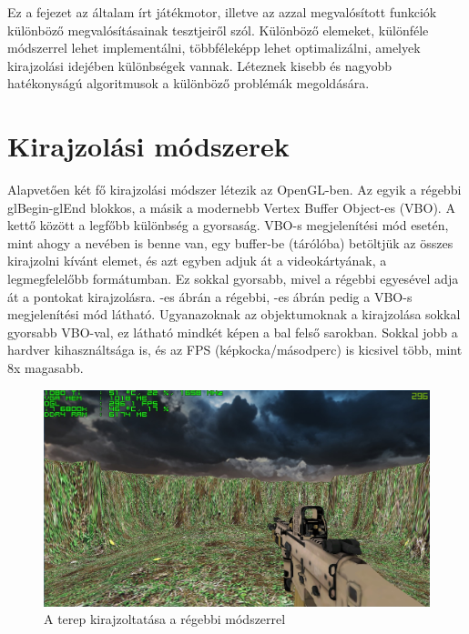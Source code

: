 \label{Chap:tesztek}


Ez a fejezet az általam írt játékmotor, illetve az azzal megvalósított funkciók különböző megvalósításainak tesztjeiről szól. Különböző elemeket, különféle módszerrel lehet implementálni, többféleképp lehet optimalizálni, amelyek kirajzolási idejében különbségek vannak. Léteznek kisebb és nagyobb hatékonyságú algoritmusok a különböző problémák megoldására.

\section{Kirajzolási módszerek}

Alapvetően két fő kirajzolási módszer létezik az OpenGL-ben. Az egyik a régebbi glBegin-glEnd blokkos, a másik a modernebb Vertex Buffer Object-es (VBO). A kettő között a legfőbb különbség a gyorsaság. VBO-s megjelenítési mód esetén, mint ahogy a nevében is benne van, egy buffer-be (tárólóba) betöltjük az összes kirajzolni kívánt elemet, és azt egyben adjuk át a videokártyának, a legmegfelelőbb formátumban. Ez sokkal gyorsabb, mivel a régebbi egyesével adja át a pontokat kirajzolásra. -es ábrán a régebbi, -es  ábrán pedig a VBO-s megjelenítési mód látható. Ugyanazoknak az objektumoknak a kirajzolása sokkal gyorsabb VBO-val, ez látható mindkét képen a bal felső sarokban. Sokkal jobb a hardver kihasználtsága is, és az FPS (képkocka/másodperc) is kicsivel több, mint 8x magasabb.

\begin{figure}[h]
\centering
\includegraphics[scale=0.35]{kepek/old_method_fps.png}
\caption{A terep kirajzoltatása a régebbi módszerrel}
\label{fig:old_fps}
\end{figure}

